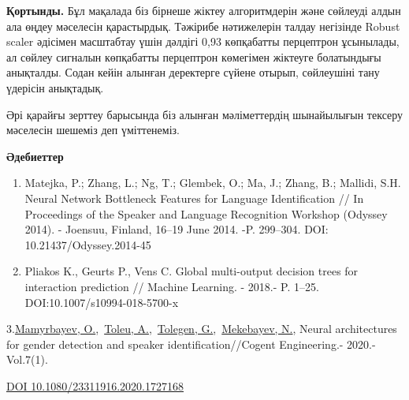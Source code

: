 {\bfseries Қортынды.} Бұл мақалада біз бірнеше жіктеу алгоритмдерін және
сөйлеуді алдын ала өңдеу мәселесін қарастырдық. Тәжірибе нәтижелерін
талдау негізінде Robust scaler әдісімен масштабтау үшін дәлдігі 0,93
көпқабатты перцептрон ұсынылады, ал сөйлеу сигналын көпқабатты
перцептрон көмегімен жіктеуге болатындығы анықталды. Содан кейін алынған
деректерге сүйене отырып, сөйлеушіні тану үдерісін анықтадық.

Әрі қарайғы зерттеу барысында біз алынған мәліметтердің шынайылығын
тексеру мәселесін шешеміз деп үміттенеміз.

{\bfseries Әдебиеттер}

\begin{enumerate}
\def\labelenumi{\arabic{enumi}.}
\item
  Matejka, P.; Zhang, L.; Ng, T.; Glembek, O.; Ma, J.; Zhang, B.;
  Mallidi, S.H. Neural Network Bottleneck Features for Language
  Identification // In Proceedings of the Speaker and Language
  Recognition Workshop (Odyssey 2014). - Joensuu, Finland, 16--19 June
  2014. -P. 299--304. DOI: 10.21437/Odyssey.2014-45
\item
  Pliakos K., Geurts P., Vens C. Global multi-output decision trees for
  interaction prediction // Machine Learning. - 2018.- P. 1--25.
  DOI:10.1007/s10994-018-5700-x
\end{enumerate}

3.\href{https://www.scopus.com/authid/detail.uri?authorId=55967630400}{Mamyrbayev,
O.},~\href{https://www.scopus.com/authid/detail.uri?authorId=57200275502}{Toleu,
A.},~\href{https://www.scopus.com/authid/detail.uri?authorId=57200276217}{Tolegen,
G.},~\href{https://www.scopus.com/authid/detail.uri?authorId=57202316868}{Mekebayev,
N.}, Neural architectures for gender detection and speaker
identification//Cogent Engineering.- 2020.-Vol.7(1).

\href{https://doi.org/10.1080/23311916.2020.1727168}{DOI
10.1080/23311916.2020.1727168}


